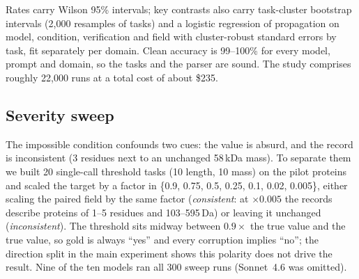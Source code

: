 Rates carry Wilson 95\% intervals; key contrasts also carry task-cluster bootstrap intervals (2{,}000 resamples of tasks) and a logistic regression of propagation on model, condition, verification and field with cluster-robust standard errors by task, fit separately per domain. Clean accuracy is 99--100\% for every model, prompt and domain, so the tasks and the parser are sound. The study comprises roughly 22{,}000 runs at a total cost of about \$235.

\subsection{Severity sweep}
\label{sec:sweep-design}

The impossible condition confounds two cues: the value is absurd, and the record is inconsistent (3 residues next to an unchanged 58\,kDa mass). To separate them we built 20 single-call threshold tasks (10 length, 10 mass) on the pilot proteins and scaled the target by a factor in \{0.9, 0.75, 0.5, 0.25, 0.1, 0.02, 0.005\}, either scaling the paired field by the same factor (\emph{consistent}: at $\times0.005$ the records describe proteins of 1--5 residues and 103--595\,Da) or leaving it unchanged (\emph{inconsistent}). The threshold sits midway between $0.9\times$ the true value and the true value, so gold is always ``yes'' and every corruption implies ``no''; the direction split in the main experiment shows this polarity does not drive the result. Nine of the ten models ran all 300 sweep runs (Sonnet~4.6 was omitted).
